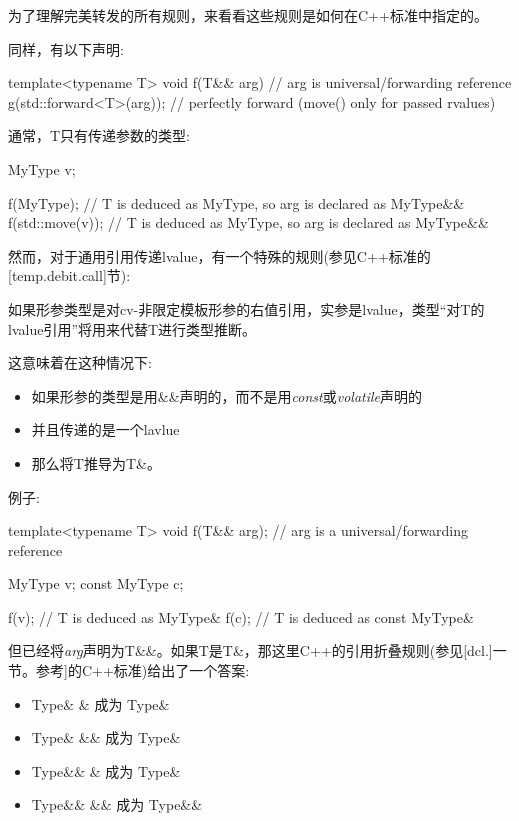 为了理解完美转发的所有规则，来看看这些规则是如何在C++标准中指定的。

同样，有以下声明:

\begin{cppcode}
template<typename T>
void f(T&& arg) // arg is universal/forwarding reference
{
	g(std::forward<T>(arg)); // perfectly forward (move() only for passed rvalues)
}
\end{cppcode}

通常，T只有传递参数的类型:

\begin{cppcode}
MyType v;

f(MyType{}); // T is deduced as MyType, so arg is declared as MyType&&
f(std::move(v)); // T is deduced as MyType, so arg is declared as MyType&&
\end{cppcode}

然而，对于通用引用传递lvalue，有一个特殊的规则(参见C++标准的[temp.debit.call]节):

如果形参类型是对cv-非限定模板形参的右值引用，实参是lvalue，类型“对T的lvalue引用”将用来代替T进行类型推断。



这意味着在这种情况下:

\begin{itemize}
	\item 如果形参的类型是用\&\&声明的，而不是用\textit{const}或\textit{volatile}声明的
	\item 并且传递的是一个lavlue
	\item 那么将T推导为T\&。
\end{itemize}

例子:

\begin{cppcode}
template<typename T>
void f(T&& arg); // arg is a universal/forwarding reference

MyType v;
const MyType c;

f(v); // T is deduced as MyType&
f(c); // T is deduced as const MyType&
\end{cppcode}

但已经将\textit{arg}声明为T\&\&。如果T是T\&，那这里C++的引用折叠规则(参见[dcl.]一节。参考]的C++标准)给出了一个答案:

\begin{itemize}
	\item Type\& \& 成为 Type\&
	\item Type\& \&\& 成为 Type\&
	\item Type\&\& \& 成为 Type\&
	\item Type\&\& \&\& 成为 Type\&\&
\end{itemize}

